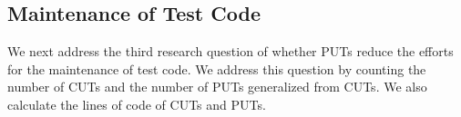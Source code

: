 \subsection{Maintenance of Test Code}

We next address the third research question of whether PUTs reduce the efforts for the
maintenance of test code. We address this question by counting the number of CUTs and
the number of PUTs generalized from CUTs. We also calculate the lines of code of CUTs
and PUTs. 